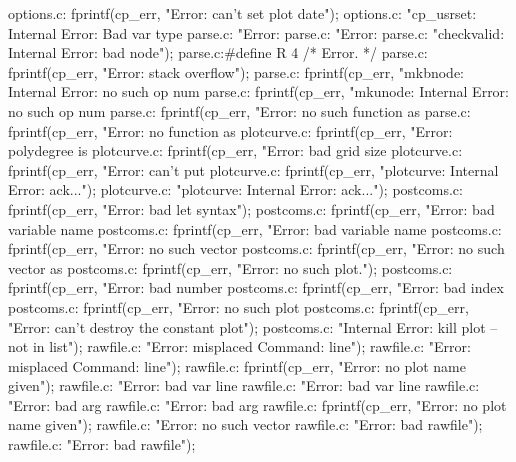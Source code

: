 {{{{{{options.c:            fprintf(cp_err, "Error: can't set plot date\n");
options.c:            "cp_usrset: Internal Error: Bad var type %
parse.c:                    "Error: %
parse.c:                        "Error: %
parse.c:                "checkvalid: Internal Error: bad node\n");
parse.c:#define R 4 /* Error. */
parse.c:                fprintf(cp_err, "Error: stack overflow\n");
parse.c:        fprintf(cp_err, "mkbnode: Internal Error: no such op num %
parse.c:        fprintf(cp_err, "mkunode: Internal Error: no such op num %
parse.c:            fprintf(cp_err, "Error: no such function as %
parse.c:        fprintf(cp_err, "Error: no function as %
plotcurve.c:        fprintf(cp_err, "Error: polydegree is %
plotcurve.c:        fprintf(cp_err, "Error: bad grid size %
plotcurve.c:            fprintf(cp_err, "Error: can't put %
plotcurve.c:            fprintf(cp_err, "plotcurve: Internal Error: ack...\n");
plotcurve.c:                    "plotcurve: Internal Error: ack...\n");
postcoms.c:            fprintf(cp_err, "Error: bad let syntax\n");
postcoms.c:        fprintf(cp_err, "Error: bad variable name %
postcoms.c:                fprintf(cp_err, "Error: bad variable name %
postcoms.c:            fprintf(cp_err, "Error: no such vector %
postcoms.c:            fprintf(cp_err, "Error: no such vector as %
postcoms.c:            fprintf(cp_err, "Error: no such plot.\n");
postcoms.c:        fprintf(cp_err, "Error: bad number %
postcoms.c:        fprintf(cp_err, "Error: bad index %
postcoms.c:                fprintf(cp_err, "Error: no such plot %
postcoms.c:        fprintf(cp_err, "Error: can't destroy the constant plot\n");
postcoms.c:                "Internal Error: kill plot -- not in list\n");
rawfile.c:                    "Error: misplaced Command: line\n");
rawfile.c:                    "Error: misplaced Command: line\n");
rawfile.c:                fprintf(cp_err, "Error: no plot name given\n");
rawfile.c:                        "Error: bad var line %
rawfile.c:                        "Error: bad var line %
rawfile.c:                            "Error: bad arg %
rawfile.c:                            "Error: bad arg %
rawfile.c:                fprintf(cp_err, "Error: no plot name given\n");
rawfile.c:                        "Error: no such vector %
rawfile.c:                        "Error: bad rawfile\n");
rawfile.c:                        "Error: bad rawfile\n");
}}}}}}
